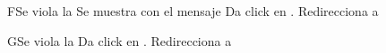 		\begin{UCtrayectoriaA}{F}{Se viola la   }
			\UCpaso[\UCsist] Se muestra     con el mensaje 
			\UCpaso[\UCactor] Da click en  .
			\UCpaso[\UCsist] Redirecciona a    
		\end{UCtrayectoriaA}


		\begin{UCtrayectoriaA}{G}{Se viola la   }
			\UCpaso[\UCactor] Da click en  .
			\UCpaso[\UCsist] Redirecciona a   

		\end{UCtrayectoriaA}










		
